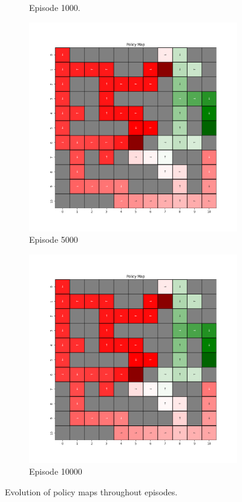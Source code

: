 \documentclass{assignment}
\begin{document}
\begin{figure}[H]
\begin{subfigure}{0.3\textwidth}
    \caption{Episode 1000.}
    \end{subfigure}\hfill
    \begin{subfigure}{0.3\textwidth}
        \includegraphics[width=\textwidth]{figures/policy_q/epsilon_sweep/policy_alpha_0.1_gamma_0.95_epsilon_0.8_iteration_5000.png}
    \caption{Episode 5000}
    \end{subfigure}\hfill
    \begin{subfigure}{0.3\textwidth}
        \includegraphics[width=\textwidth]{figures/policy_q/epsilon_sweep/policy_alpha_0.1_gamma_0.95_epsilon_0.8_iteration_10000.png}
    \caption{Episode 10000}
    \end{subfigure}
    \caption{Evolution of policy maps throughout episodes.}
    \label{fig:epsilon_0.8_q_learning_policy}
\end{figure}
\end{document}
